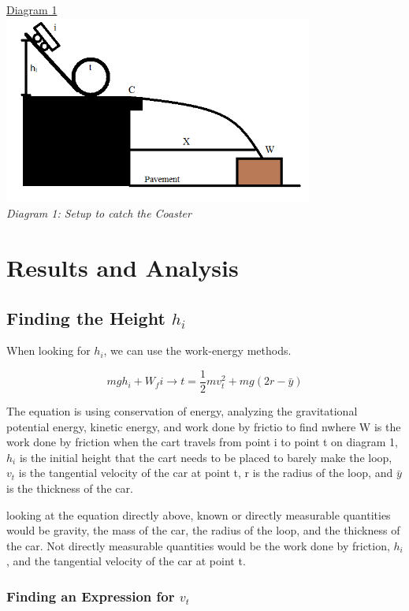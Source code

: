 \documentclass[aps,letterpaper,11pt]{revtex4}
\begin{document}
\begin{center}
\underline{Diagram 1}\\
\includegraphics[width = 4in]{Setup.png}\\
\textit{Diagram 1: Setup to catch the Coaster}\\
\end{center}

\section{Results and Analysis}

\subsection{Finding the Height $h_i$}

When looking for $h_i$, we can use the work-energy methods. 

$$ mgh_i + W_{f}i \rightarrow t = \frac{1}{2}mv_t^2 + mg(2r-\bar{y})$$

The equation is using conservation of energy, analyzing the gravitational potential energy, kinetic energy, and work done by frictio to find nwhere W is the work done by friction when the cart travels from point i to point t on diagram 1, $h_i$ is the initial height that the cart needs to be placed to barely make the loop, $v_t$ is the tangential velocity of the car at point t, r is the radius of the loop, and $\bar{y}$ is the thickness of the car.   

looking at the equation directly above, known or directly measurable quantities would be gravity, the mass of the car, the radius of the loop, and the thickness of the car. Not directly measurable quantities would be the work done by friction, $h_i$, and the tangential velocity of the car at point t.

\subsubsection{Finding an Expression for $v_t$}
\end{document}
